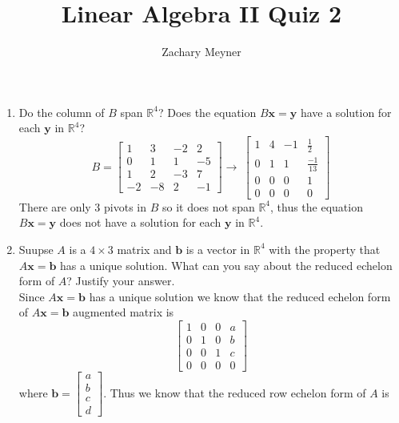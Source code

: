 \documentclass[12pt]{article}
\title{\large Linear Algebra II Quiz 2}
\author{\large Zachary Meyner}
\date{}
\newcommand\setitemnumber[1]{\setcounter{enumi}{\numexpr#1-- -1\relax}}
\begin{document}
\maketitle
\begin{enumerate}[label=\textbf{\arabic*.}]
    \setitemnumber{18}
    \item Do the column of $B$ span $\mathbb{R}^4$? Does the equation $B\mathbf{x}=\mathbf{y}$ have a solution for each $\mathbf{y}$ 
    in $\mathbb{R}^4$?
    \[
        B = \begin{bmatrix}
            1 & 3 & -2 & 2 \\
            0 & 1 & 1 & -5 \\
            1 & 2 & -3 & 7 \\
            -2 & -8 & 2 & -1
        \end{bmatrix} \rightarrow \ \begin{bmatrix}
            1 & 4 & -1 & \frac{1}{2} \\
            0 & 1 & 1 & \frac{-1}{13} \\
            0 & 0 & 0 & 1 \\
            0 & 0 & 0 & 0
        \end{bmatrix}
    \]
    There are only 3 pivots in $B$ so it does not span $\mathbb{R}^4$, thus the equation $B\mathbf{x}=\mathbf{y}$ does 
    not have a solution for each $\mathbf{y}$ in $\mathbb{R}^4$.
    \setitemnumber{43}
    \item Suupse $A$ is a $4 \times 3$ matrix and $\mathbf{b}$ is a vector in $\mathbb{R}^4$ with the property that $A\mathbf{x}=\mathbf{b}$ has 
    a unique solution. What can you say about the reduced echelon form of $A$? Justify 
    your answer. \\
    Since $A\mathbf{x} = \mathbf{b}$ has a unique solution we know that the reduced echelon form of $A\mathbf{x}=\mathbf{b}$ 
    augmented matrix is
    \[
        \begin{bmatrix}
            1 & 0 & 0 & a \\
            0 & 1 & 0 & b \\
            0 & 0 & 1 & c \\
            0 & 0 & 0 & 0
        \end{bmatrix}
    \]
    where $\mathbf{b} = \begin{bmatrix}
        a \\ b \\ c \\ d
    \end{bmatrix}
    $. Thus we know that the reduced row echelon form of $A$ is 

\end{enumerate}
\end{document}
